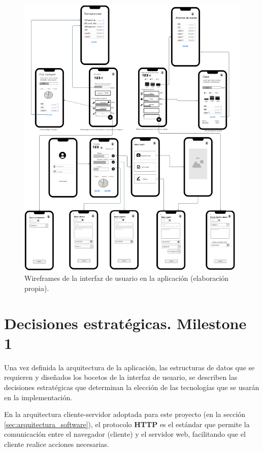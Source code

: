 \begin{figure}[ht!]
    \centering
    \includegraphics[width=\linewidth]{imagenes/wireframe.moqups.png}
    \caption{Wireframes de la interfaz de usuario en la aplicación (elaboración propia).}
    \label{fig:wireframes_vistas}
\end{figure}



\section{Decisiones estratégicas. Milestone 1}
Una vez definida la arquitectura de la aplicación, las estructuras de datos que se requieren y diseñados los bocetos de la interfaz de usuario, se describen las decisiones estratégicas que determinan la elección de las tecnologías que se usarán en la implementación.


En la arquitectura cliente-servidor adoptada para este proyecto (en la sección \ref{sec:arquitectura_software}), el protocolo \textbf{HTTP} es el estándar que permite la comunicación entre el navegador (cliente) y el servidor web, facilitando que el cliente realice acciones necesarias. 


